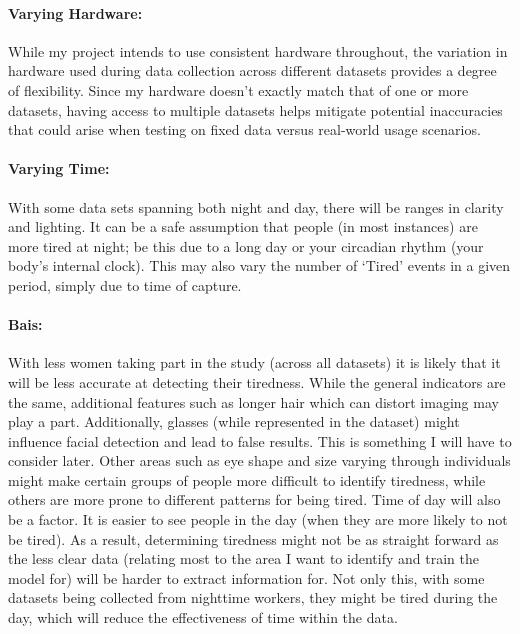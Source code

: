 \paragraph{Varying Hardware:}
While my project intends to use consistent hardware throughout, the variation in hardware used during data collection across different
datasets provides a degree of flexibility. Since my hardware doesn’t exactly match that of one or more datasets, having access to
multiple datasets helps mitigate potential inaccuracies that could arise when testing on fixed data versus real-world usage scenarios.
\paragraph{Varying Time:}
With some data sets spanning both night and day, there will be ranges in clarity and lighting. It can be a safe assumption that people
(in most instances) are more tired at night; be this due to a long day or your circadian rhythm (your body’s internal clock). This may
also vary the number of ‘Tired’ events in a given period, simply due to time of capture.
\paragraph{Bais:}
With less women taking part in the study (across all datasets) it is likely that it will be less accurate at detecting their tiredness.
While the general indicators are the same, additional features such as longer hair which can distort imaging may play a part. Additionally,
glasses (while represented in the dataset) might influence facial detection and lead to false results. This is something I will have to
consider later. Other areas such as eye shape and size varying through individuals might make certain groups of people more difficult to
identify tiredness, while others are more prone to different patterns for being tired. Time of day will also be a factor. It is easier
to see people in the day (when they are more likely to not be tired). As a result, determining tiredness might not be as straight forward
as the less clear data (relating most to the area I want to identify and train the model for) will be harder to extract information for.
Not only this, with some datasets being collected from nighttime workers, they might be tired during the day, which will reduce the
effectiveness of time within the data.
